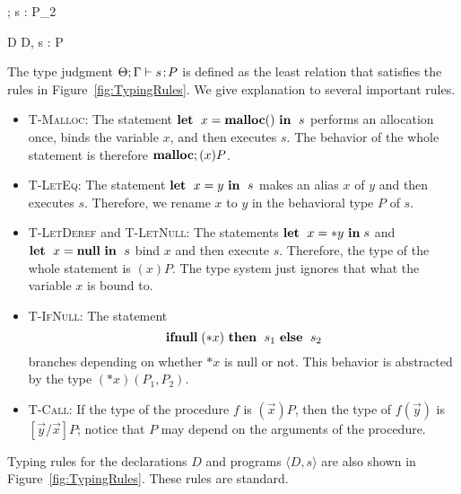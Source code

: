 \begin{figure*}
\begin{minipage}{\textwidth}

{\Theta ; \Gamma \vdash s : P_{2}}

 {\vdash D \COL \Theta}
{\vdash \langle D, s \rangle : P}

\end{minipage}
\caption{Typing rules.}
\label{fig:TypingRules}
\end{figure*}

The type judgment $\Theta; \Gamma \vdash s \!:\! P$ is defined as the
least relation that satisfies the rules in Figure~\ref{fig:TypingRules}.
We give explanation to several important rules.
\begin{itemize}
 \item \textsc{T-Malloc}: The statement $\mathbf{let}\;\ x = \mathbf{malloc}()\ \mathbf{in}\;\ s$
       performs an allocation once, binds the variable $x$, and then
       executes $s$.  The behavior of the whole statement is therefore
       $\mathbf{malloc};(x)P$.
 \item \textsc{T-LetEq}: The statement $\mathbf{let}\;\ x = y\ \mathbf{in}\;\ s$ makes an
       alias $x$ of $y$ and then executes $s$.  Therefore, we rename $x$
       to $y$ in the behavioral type $P$ of $s$.
 \item \textsc{T-LetDeref} and \textsc{T-LetNull}: The statements $\mathbf{let}\;\
       x = *y\ \mathbf{in}\; s$ and $\mathbf{let}\;\ x = \mathbf{null}\ \mathbf{in}\;\ s$ bind $x$ and then
       execute $s$.  Therefore, the type of the whole statement is
       $(x)P$.  The type system just ignores that what the variable $x$
       is bound to.
 \item \textsc{T-IfNull}: The statement 
       \[
       \mathbf{ifnull}\;(*x)\ \mathbf{then}\;\ s_1\ \mathbf{else}\;\ s_2
       \]
       branches depending on whether $*x$ is null or not.  This behavior
       is abstracted by the type $(*x)(P_1,P_2)$.
 \item \textsc{T-Call}: If the type of the procedure $f$ is
       $(\vec{x})P$, then the type of $f(\vec{y})$ is
       $[\vec{y}/\vec{x}]P$; notice that $P$ may depend on the arguments
       of the procedure.
\end{itemize}

Typing rules for the declarations $D$ and programs $\langle D, s
\rangle$ are also shown in Figure~\ref{fig:TypingRules}.  These rules
are standard.

